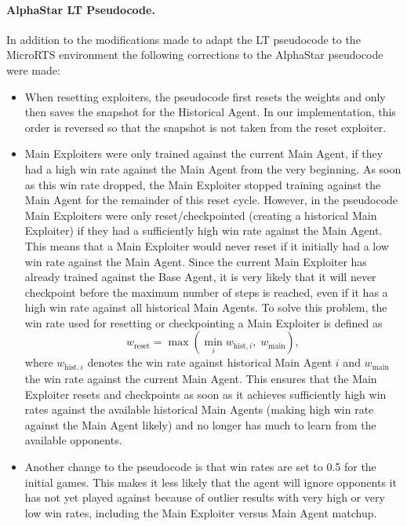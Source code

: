 \documentclass[10pt,twocolumn,letterpaper]{article}
\begin{document}
\paragraph{AlphaStar LT Pseudocode.}
In addition to the modifications made to adapt the LT pseudocode to the MicroRTS environment the following corrections to the AlphaStar pseudocode \cite{vinyals2019alphastar} were made:
\begin{itemize}
    \item When resetting exploiters, the pseudocode first resets the weights and only then saves the snapshot for the Historical Agent.
    In our implementation, this order is reversed so that the snapshot is not taken from the reset exploiter.
    \item Main Exploiters were only trained against the current Main Agent, if they had a high win rate against the Main Agent from the very beginning.
    As soon as this win rate dropped, the Main Exploiter stopped training against the Main Agent for the remainder of this reset cycle.
    However, in the pseudocode Main Exploiters were only reset/checkpointed (creating a historical Main Exploiter) if they had a sufficiently high win rate against the Main Agent.
    This means that a Main Exploiter would never reset if it initially had a low win rate against the Main Agent.
    Since the current Main Exploiter has already trained against the Base Agent, it is very likely that it will never checkpoint before the maximum number of steps is reached, even if it has a high win rate against all historical Main Agents.
    To solve this problem, the win rate used for resetting or checkpointing a Main Exploiter is defined as
    \[
        w_{\text{reset}} = \max\!\left(\min_i w_{\text{hist},i},\; w_{\text{main}}\right),
    \]
    where $w_{\text{hist},i}$ denotes the win rate against historical Main Agent $i$ and $w_{\text{main}}$ the win rate against the current Main Agent.
    This ensures that the Main Exploiter resets and checkpoints as soon as it achieves sufficiently high win rates against the available historical Main Agents (making high win rate against the Main Agent likely) and no longer has much to learn from the available opponents.
    \item Another change to the pseudocode is that win rates are set to 0.5 for the initial games.
    This makes it less likely that the agent will ignore opponents it has not yet played against because of outlier results with very high or very low win rates, including the Main Exploiter versus Main Agent matchup.
\end{itemize}
\end{document}

